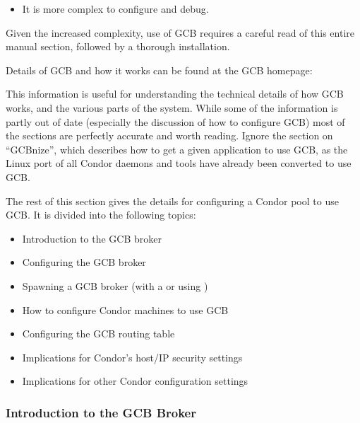 \begin{itemize}
\item It is more complex to configure and debug.

\end{itemize}

Given the increased complexity, use of GCB requires a careful
read of this entire manual section, followed by a thorough
installation.

Details of GCB and how it works can be found at the GCB
homepage:


This information is useful for understanding the technical
details of how GCB works, and the various parts of the system.
While some of the information is partly out of date (especially the
discussion of how to configure GCB) most of the sections are perfectly
accurate and worth reading.
Ignore the section on ``GCBnize'', which describes
how to get a given application to use GCB, as 
the Linux port of all Condor daemons and tools have already 
been converted to use GCB.



The rest of this section gives the details for configuring a
Condor pool to use GCB.
It is divided into the following topics:

\begin{itemize}
\item Introduction to the GCB broker
\item Configuring the GCB broker
\item Spawning a GCB broker (with a  or using )
\item How to configure Condor machines to use GCB
\item Configuring the GCB routing table
\item Implications for Condor's host/IP security settings
\item Implications for other Condor configuration settings
\end{itemize}


\subsubsection{\label{sec:GCB-Broker-Intro}Introduction to the GCB Broker}

